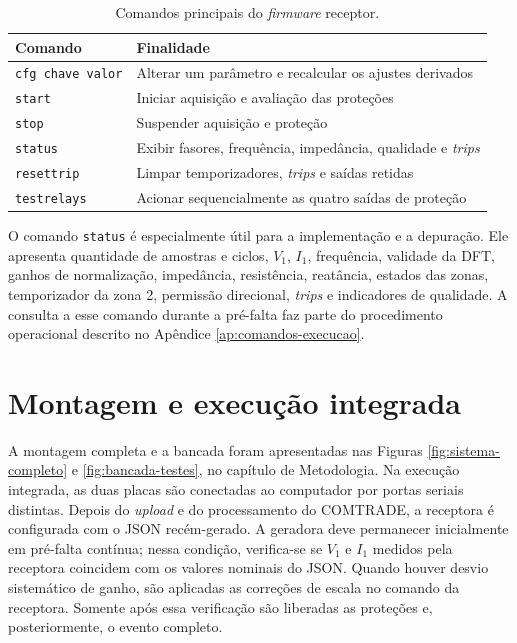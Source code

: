 \begin{table}[H]
  \centering
  \small
  \caption{Comandos principais do \textit{firmware} receptor.}
  \label{tab:comandos-receptor}
  \begin{tabular}{ll}
    \toprule
    Comando & Finalidade \\
    \midrule
    \texttt{cfg chave valor} & Alterar um parâmetro e recalcular os ajustes derivados \\
    \texttt{start} & Iniciar aquisição e avaliação das proteções \\
    \texttt{stop} & Suspender aquisição e proteção \\
    \texttt{status} & Exibir fasores, frequência, impedância, qualidade e \textit{trips} \\
    \texttt{resettrip} & Limpar temporizadores, \textit{trips} e saídas retidas \\
    \texttt{testrelays} & Acionar sequencialmente as quatro saídas de proteção \\
    \bottomrule
  \end{tabular}
\end{table}

O comando \texttt{status} é especialmente útil para a implementação e a depuração. Ele apresenta quantidade de amostras e ciclos, $V_1$, $I_1$, frequência, validade da DFT, ganhos de normalização, impedância, resistência, reatância, estados das zonas, temporizador da zona 2, permissão direcional, \textit{trips} e indicadores de qualidade. A consulta a esse comando durante a pré-falta faz parte do procedimento operacional descrito no Apêndice \ref{ap:comandos-execucao}.

\section{Montagem e execução integrada}

A montagem completa e a bancada foram apresentadas nas Figuras \ref{fig:sistema-completo} e \ref{fig:bancada-testes}, no capítulo de Metodologia. Na execução integrada, as duas placas são conectadas ao computador por portas seriais distintas. Depois do \textit{upload} e do processamento do COMTRADE, a receptora é configurada com o JSON recém-gerado. A geradora deve permanecer inicialmente em pré-falta contínua; nessa condição, verifica-se se $V_1$ e $I_1$ medidos pela receptora coincidem com os valores nominais do JSON. Quando houver desvio sistemático de ganho, são aplicadas as correções de escala no comando da receptora. Somente após essa verificação são liberadas as proteções e, posteriormente, o evento completo.

